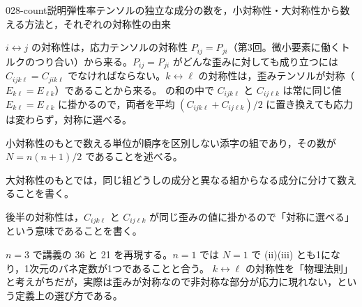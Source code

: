 \documentclass[uplatex,dvipdfmx,a4paper,11pt]{jsarticle}
\begin{document}
\begin{mondai}{028-count}{説明}{弾性率テンソルの独立な成分の数を，小対称性・大対称性から数える方法と，それぞれの対称性の由来}
\begin{tadashii}
 $i\leftrightarrow j$ の対称性は，応力テンソルの対称性 $P_{ij}=P_{ji}$（第3回。微小要素に働くトルクのつり合い）から来る。$P_{ij}=P_{ji}$ がどんな歪みに対しても成り立つには $C_{ijk\ell}=C_{jik\ell}$ でなければならない。$k\leftrightarrow\ell$ の対称性は，歪みテンソルが対称（$E_{k\ell}=E_{\ell k}$）であることから来る。 の和の中で $C_{ijk\ell}$ と $C_{ij\ell k}$ は常に同じ値 $E_{k\ell}=E_{\ell k}$ に掛かるので，両者を平均 $(C_{ijk\ell}+C_{ij\ell k})/2$ に置き換えても応力は変わらず，対称に選べる。
\begin{ronten}
  \item 小対称性のもとで数える単位が順序を区別しない添字の組であり，その数が $N=n(n+1)/2$ であることを述べる。
  \item 大対称性のもとでは，同じ組どうしの成分と異なる組からなる成分に分けて数えることを書く。
  \item {} 後半の対称性は，$C_{ijk\ell}$ と $C_{ij\ell k}$ が同じ歪みの値に掛かるので「対称に選べる」という意味であることを書く。
\end{ronten}
\kenzan $n=3$ で講義の 36 と 21 を再現する。$n=1$ では $N=1$ で (ii)(iii) とも1になり，1次元のバネ定数が1つであることと合う。
\tsumazuki $k\leftrightarrow\ell$ の対称性を「物理法則」と考えがちだが，実際は歪みが対称なので非対称な部分が応力に現れない，という定義上の選び方である。
\end{tadashii}
\end{mondai}
\end{document}
